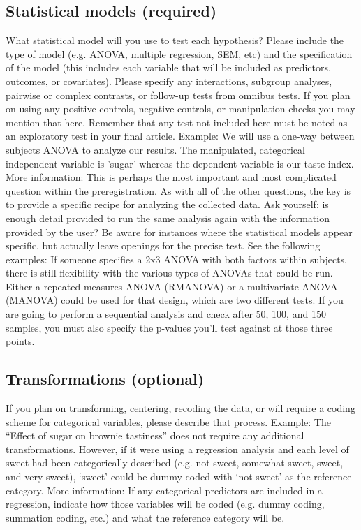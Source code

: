 \documentclass[
10pt, %
a4paper, %
oneside, %
headinclude,footinclude, %
BCOR5mm, %
]{scrartcl}
\begin{document}
\subsection{Statistical models (required)}
What statistical model will you use to test each hypothesis? Please include the type of model (e.g. ANOVA, multiple regression, SEM, etc) and the specification of the model (this includes each variable that will be included as predictors, outcomes, or covariates). Please specify any interactions, subgroup analyses, pairwise or complex contrasts, or follow-up tests from omnibus tests. If you plan on using any positive controls, negative controls, or manipulation checks you may mention that here. Remember that any test not included here must be noted as an exploratory test in your final article. 
Example:  We will use a one-way between subjects ANOVA to analyze our results. The manipulated, categorical independent variable is 'sugar' whereas the dependent variable is our taste index. 
More information: This is perhaps the most important and most complicated question within the preregistration. As with all of the other questions, the key is to provide a specific recipe for analyzing the collected data. Ask yourself: is enough detail provided to run the same analysis again with the information provided by the user? Be aware for instances where the statistical models appear specific, but actually leave openings for the precise test. See the following examples: 
If someone specifies a 2x3 ANOVA with both factors within subjects, there is still flexibility with the various types of ANOVAs that could be run. Either a repeated measures ANOVA (RMANOVA) or a multivariate ANOVA (MANOVA) could be used for that design, which are two different tests. 
If you are going to perform a sequential analysis and check after 50, 100, and 150 samples, you must also specify the p-values you’ll test against at those three points.



\subsection{Transformations (optional)}
If you plan on transforming, centering, recoding the data, or will require a coding scheme for categorical variables, please describe that process.
Example: The “Effect of sugar on brownie tastiness” does not require any additional transformations. However, if it were using a regression analysis and each level of sweet had been categorically described (e.g. not sweet, somewhat sweet, sweet, and very sweet), ‘sweet’ could be dummy coded with ‘not sweet’ as the reference category. 
More information: If any categorical predictors are included in a regression, indicate how those variables will be coded (e.g. dummy coding, summation coding, etc.) and what the reference category will be.
\end{document}
